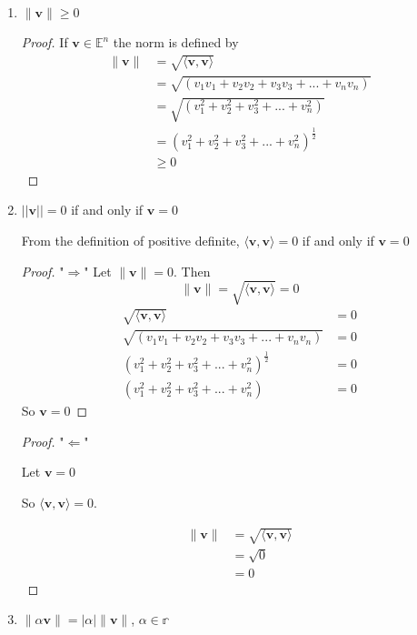 \documentclass{tufte-book}
\theoremstyle{mytheoremstyle}
\theoremstyle{mylemstyle}
\theoremstyle{mydefstyle}
\begin{document}
\begin{enumerate}

\item $\|\mathbf{v}\| \geq 0$

\begin{proof}
If $\mathbf{v} \in \mathbb{E}^n$ the norm is defined by
\begin{align*}
\|\mathbf{v}\| &= \sqrt{\langle \mathbf{v}, \mathbf{v} \rangle}\\
&= \sqrt{(v_1v_1 + v_2v_2 + v_3v_3 +...+v_nv_n)} \\
&= \sqrt{(v_1^2 + v_2^2 + v_3^2 +...+v_n^2)} \\
&= (v_1^2 + v_2^2 + v_3^2 +...+v_n^2)^{\frac{1}{2}} \\
&\geq 0
\end{align*}
\end{proof}

\item $||\mathbf{v}|| = 0$ if and only if $\mathbf{v} = 0$

From the definition of positive definite, $\langle \mathbf{v}, \mathbf{v} \rangle = 0$ if and only if $\mathbf{v} = 0$
\begin{proof} "$\Rightarrow$"
Let $\|\mathbf{v}\| = 0$.  Then
\[ \|\mathbf{v}\| = \sqrt{\langle \mathbf{v}, \mathbf{v} \rangle} = 0 \]
\begin{align*}
\sqrt{\langle \mathbf{v}, \mathbf{v} \rangle} &= 0\\
\sqrt{(v_1v_1 + v_2v_2 + v_3v_3 +...+v_nv_n)} &= 0\\
(v_1^2 + v_2^2 + v_3^2 +...+v_n^2)^{\frac{1}{2}} &= 0 \\
(v_1^2 + v_2^2 + v_3^2 +...+v_n^2)&= 0
\end{align*}
So $\mathbf{v} = 0$
\end{proof}

\begin{proof} "$\Leftarrow$"

Let $\mathbf{v} = 0$

So $\langle \mathbf{v}, \mathbf{v} \rangle = 0$.

\begin{align*}
\|\mathbf{v}\| &= \sqrt{\langle \mathbf{v}, \mathbf{v} \rangle} \\
&= \sqrt{0} \\
&= 0
\end{align*}
\end{proof}

\item $\|\alpha \mathbf{v}\| = |\alpha| \|\mathbf{v}\|$, $\alpha \in \mathbb{r}$


\end{enumerate}
\end{document}
